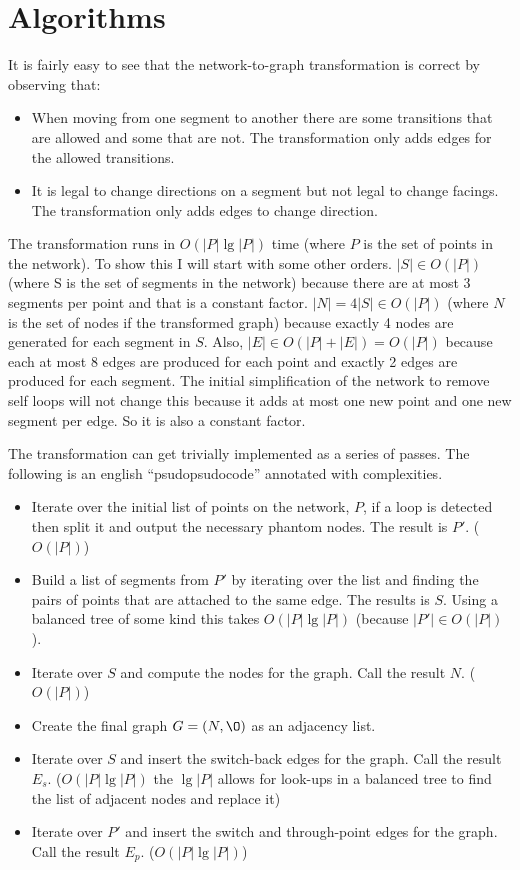 \documentclass[11pt]{article}
\newcommand{\<}{\langle}
\renewcommand{\>}{\rangle}
\begin{document}
\section{Algorithms}

It is fairly easy to see that the network-to-graph transformation is correct by observing that:

\begin{itemize}
\item When moving from one segment to another there are some transitions that are allowed and some that are not. The transformation only adds edges for the allowed transitions.
\item It is legal to change directions on a segment but not legal to change facings. The transformation only adds edges to change direction.
\end{itemize}

The transformation runs in $O(|P| \lg |P|)$ time (where $P$ is the set of points in the network). To show this I will start with some other orders. $|S| \in O(|P|)$ (where S is the set of segments in the network) because there are at most 3 segments per point and that is a constant factor. $|N| = 4|S| \in O(|P|)$ (where $N$ is the set of nodes if the transformed graph) because exactly 4 nodes are generated for each segment in $S$. Also, $|E| \in O(|P| + |E|) = O(|P|)$ because each at most 8 edges are produced for each point and exactly 2 edges are produced for each segment. The initial simplification of the network to remove self loops will not change this because it adds at most one new point and one new segment per edge. So it is also a constant factor.

The transformation can get trivially implemented as a series of passes. The following is an english ``psudopsudocode'' annotated with complexities.

\begin{itemize}
\item Iterate over the initial list of points on the network, $P$, if a loop is detected then split it and output the necessary phantom nodes. The result is $P'$. ($O(|P|)$)
\item Build a list of segments from $P'$ by iterating over the list and finding the pairs of points that are attached to the same edge. The results is $S$. Using a balanced tree of some kind this takes $O(|P| \lg |P|)$ (because $|P'| \in O(|P|)$).
\item Iterate over $S$ and compute the nodes for the graph. Call the result $N$. ($O(|P|)$)
\item Create the final graph $G = (N, \O)$ as an adjacency list.
\item Iterate over $S$ and insert the switch-back edges for the graph. Call the result $E_s$. ($O(|P| \lg |P|)$ the $\lg |P|$ allows for look-ups in a balanced tree to find the list of adjacent nodes and replace it)
\item Iterate over $P'$ and insert the switch and through-point edges for the graph. Call the result $E_p$. ($O(|P| \lg |P|)$)
\end{itemize}
\end{document}
